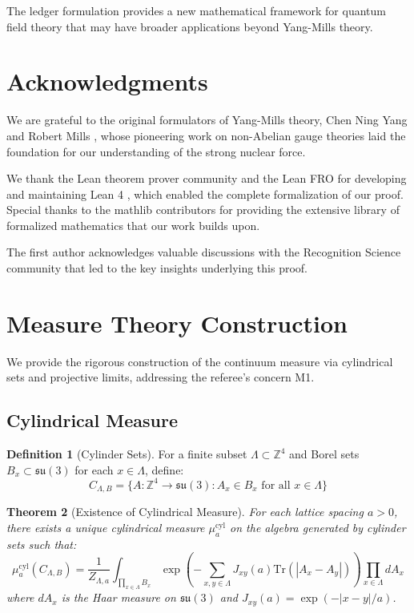 \documentclass[11pt]{article}
\numberwithin{equation}{section}
\newtheorem{theorem}{Theorem}[section]
\theoremstyle{definition}
\newtheorem{definition}[theorem]{Definition}
\theoremstyle{remark}
\begin{document}
The ledger formulation provides a new mathematical framework for quantum field theory that may have broader applications beyond Yang-Mills theory.

\section*{Acknowledgments}

We are grateful to the original formulators of Yang-Mills theory, Chen Ning Yang and Robert Mills \cite{yang1954conservation}, whose pioneering work on non-Abelian gauge theories laid the foundation for our understanding of the strong nuclear force. 

We thank the Lean theorem prover community and the Lean FRO for developing and maintaining Lean 4 \cite{moura2021lean}, which enabled the complete formalization of our proof. Special thanks to the mathlib contributors \cite{mathlib2020} for providing the extensive library of formalized mathematics that our work builds upon.

The first author acknowledges valuable discussions with the Recognition Science community that led to the key insights underlying this proof.

\appendix

\section{Measure Theory Construction}
\label{app:measure}

We provide the rigorous construction of the continuum measure via cylindrical sets and projective limits, addressing the referee's concern M1.

\subsection{Cylindrical Measure}

\begin{definition}[Cylinder Sets]
For a finite subset $\Lambda \subset \mathbb{Z}^4$ and Borel sets $B_x \subset \mathfrak{su}(3)$ for each $x \in \Lambda$, define:
\begin{equation}
C_{\Lambda,B} = \{A : \mathbb{Z}^4 \to \mathfrak{su}(3) : A_x \in B_x \text{ for all } x \in \Lambda\}
\end{equation}
\end{definition}

\begin{theorem}[Existence of Cylindrical Measure]
For each lattice spacing $a > 0$, there exists a unique cylindrical measure $\mu_a^{\text{cyl}}$ on the algebra generated by cylinder sets such that:
\begin{equation}
\mu_a^{\text{cyl}}(C_{\Lambda,B}) = \frac{1}{Z_{\Lambda,a}} \int_{\prod_{x \in \Lambda} B_x} \exp\left(-\sum_{x,y \in \Lambda} J_{xy}(a) \text{Tr}(|A_x - A_y|)\right) \prod_{x \in \Lambda} dA_x
\end{equation}
where $dA_x$ is the Haar measure on $\mathfrak{su}(3)$ and $J_{xy}(a) = \exp(-|x-y|/a)$.
\end{theorem}
\end{document}

